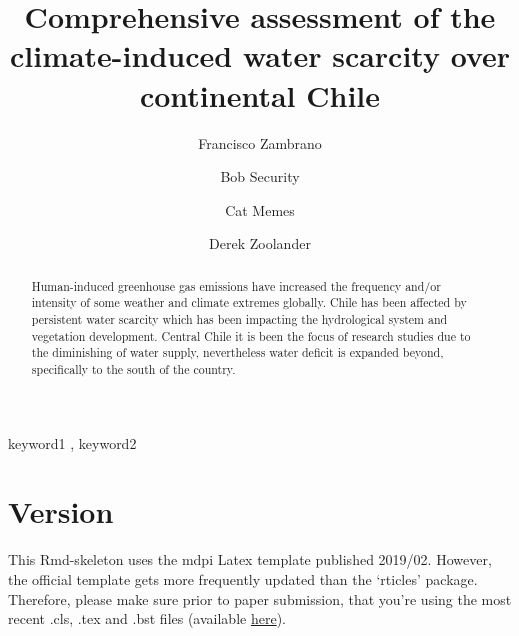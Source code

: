 \documentclass[preprint,
3p]{elsarticle} %
\begin{document}
\begin{frontmatter}

  \title{Comprehensive assessment of the climate-induced water scarcity
over continental Chile}
    \author[Hemera Centro de Observación de la Tierra,Universidad
Mayor]{Francisco Zambrano%
  }
    \author[Another University]{Bob Security%
  }
    \author[Another University]{Cat Memes%
  }
    \author[Some Institute of Technology]{Derek Zoolander%
  }
  
  \begin{abstract}
  Human-induced greenhouse gas emissions have increased the frequency
  and/or intensity of some weather and climate extremes globally. Chile
  has been affected by persistent water scarcity which has been
  impacting the hydrological system and vegetation development. Central
  Chile it is been the focus of research studies due to the diminishing
  of water supply, nevertheless water deficit is expanded beyond,
  specifically to the south of the country.
  \end{abstract}
    \begin{keyword}
    keyword1 \sep 
    keyword2
  \end{keyword}
  
 \end{frontmatter}

\hypertarget{version}{%
\section{Version}\label{version}}

This Rmd-skeleton uses the mdpi Latex template published 2019/02.
However, the official template gets more frequently updated than the
`rticles' package. Therefore, please make sure prior to paper
submission, that you're using the most recent .cls, .tex and .bst files
(available \href{http://www.mdpi.com/authors/latex}{here}).
\end{document}

